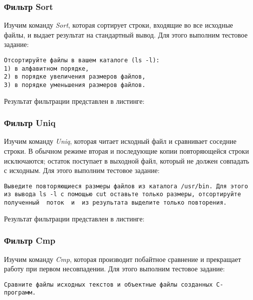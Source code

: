\documentclass[14pt,a4paper,report]{report}
\begin{document}


\subsubsection{Фильтр Sort}

Изучим команду \emph{Sort}, которая сортирует строки,  входящие во все исходные файлы, и выдает результат на стандартный вывод. Для этого выполним тестовое задание:

\begin{verbatim}
Отсортируйте файлы в вашем каталоге (ls -l): 
1) в алфавитном порядке, 
2) в порядке увеличения размеров файлов, 
3) в порядке уменьшения размеров файлов.
\end{verbatim}

Результат фильтрации представлен в листинге:



\subsubsection{Фильтр Uniq}

Изучим команду \emph{Uniq}, которая   читает  исходный  файл  и сравнивает соседние строки. В обычном режиме вторая и последующие копии повторяющейся строки исключаются;  остаток поступает в выходной файл, который не должен совпадать с исходным. Для этого выполним тестовое задание:

\begin{verbatim}
Выведите повторяющиеся размеры файлов из каталога /usr/bin. Для этого из вывода ls -l с помощью cut оставьте только размеры, отсортируйте полученный  поток  и  из результата выделите только повторения.
\end{verbatim}

Результат фильтрации представлен в листинге:



\subsubsection{Фильтр Cmp}

Изучим команду \emph{Cmp}, которая производит побайтное сравнение и прекращает работу при первом несовпадении. Для этого выполним тестовое задание:

\begin{verbatim}
Сравните файлы исходных текстов и объектные файлы созданных С-программ.
\end{verbatim}
\end{document}
